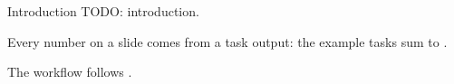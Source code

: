 \begin{frame}{Introduction}
TODO: introduction.

Every number on a slide comes from a task output: the example tasks sum to \exampleSum{}.

The workflow follows \citet{GentzkowShapiro:2014}.
\end{frame}
